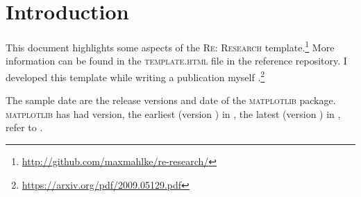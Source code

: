 
\section{Introduction}%
\label{sec:introduction}%

This document highlights some aspects of the \textsc{Re: Research}
template.\footnote{\url{http://github.com/maxmahlke/re-research/}}
More information can be found in the \textsc{template.html} file in
the reference repository. I developed this template while writing a
publication myself \citep{2009.05129v1}.\footnote{\url{https://arxiv.org/pdf/2009.05129.pdf}}

The sample date are the release versions and date of the \textsc{matplotlib} package.
\textsc{matplotlib} has had \NVersions version, the earliest (version \VersionEarliest) in
\VersionEarliestDate, the latest (version \VersionLatest) in
\VersionLatestDate, refer to .

